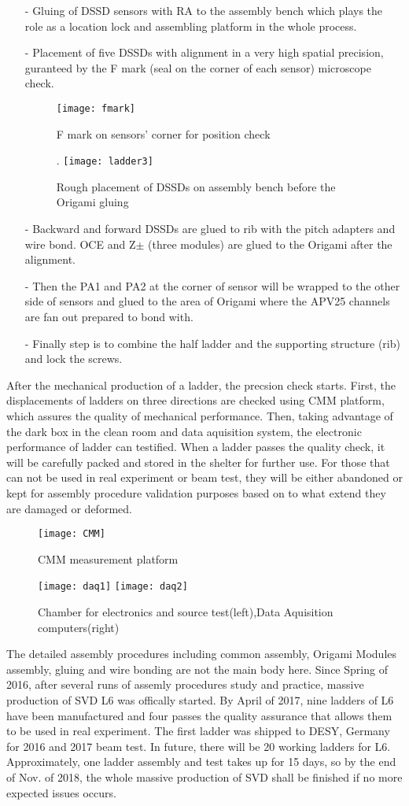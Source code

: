 \begin{itemize}
	\item[-]Gluing of DSSD sensors with RA to the assembly bench which plays the role as a location lock and assembling platform in the whole process.
	\item[-]Placement of five DSSDs with alignment in a very high spatial precision, guranteed by the F mark (seal on the corner of each sensor) microscope check.
	\begin{figure}[htbp]
		\centering
		\texttt{[image: fmark]}
		\caption{F mark on sensors' corner for position check}. 
		\texttt{[image: ladder3]}
		\caption{Rough placement of DSSDs on assembly bench before the Origami gluing}
	\end{figure}
	\item[-] Backward and forward DSSDs are glued to rib with the pitch adapters and wire bond. OCE and Z$\pm$  (three modules) are glued to the Origami after the alignment.
	\item[-] Then the PA1 and PA2 at the corner of sensor will be wrapped to the other side of sensors and glued to the area of Origami where the APV25 channels are fan out prepared to bond with. 
	\item[-] Finally step is to combine the half ladder and the supporting structure (rib) and lock the screws.  
\end{itemize}

After the mechanical production of a ladder, the precsion check starts. First, the displacements of ladders on three directions are checked using CMM platform, which  assures the quality of mechanical performance. Then, taking advantage of the dark box in the clean room and data aquisition system, the electronic performance of ladder can testified. When a ladder passes the quality check, it will be carefully packed and stored in the shelter for further use. For those that can not be used in real experiment or beam test, they will be either abandoned or kept for assembly procedure validation purposes based on to what extend they are damaged or deformed. 

\begin{figure}[htbp]
	\centering
	\texttt{[image: CMM]}
	\caption{CMM measurement platform}
	\space 
	\texttt{[image: daq1]}
	\texttt{[image: daq2]}
	\caption{Chamber for electronics and source test(left),Data Aquisition computers(right)}
\end{figure}

The detailed assembly procedures including common assembly, Origami Modules assembly, gluing and wire bonding are not the main body here. Since Spring of 2016, after several runs of assemly procedures study and practice, massive production of SVD L6 was offically started. By April of 2017, nine ladders of L6 have been manufactured and four passes the quality assurance that allows them to be used in real experiment. The first ladder was shipped to DESY, Germany for 2016 and 2017 beam test. In future, there will be 20 working ladders for L6. Approximately, one ladder assembly and test takes up for 15 days, so by the end of Nov. of 2018, the whole massive production of SVD shall be finished if no more expected issues occurs. 


